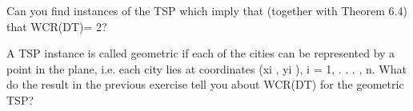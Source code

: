 \begin{exercise}
Can you find instances of the TSP which imply that (together with Theorem 6.4) that WCR(DT)= 2?
\end{exercise}

\begin{exercise}
A TSP instance is called geometric if each of the cities can be represented by a point in the plane, i.e.
each city lies at coordinates (xi , yi ), i = 1, . . . , n. What do the result in the previous exercise tell you
about WCR(DT) for the geometric TSP?
\end{exercise}